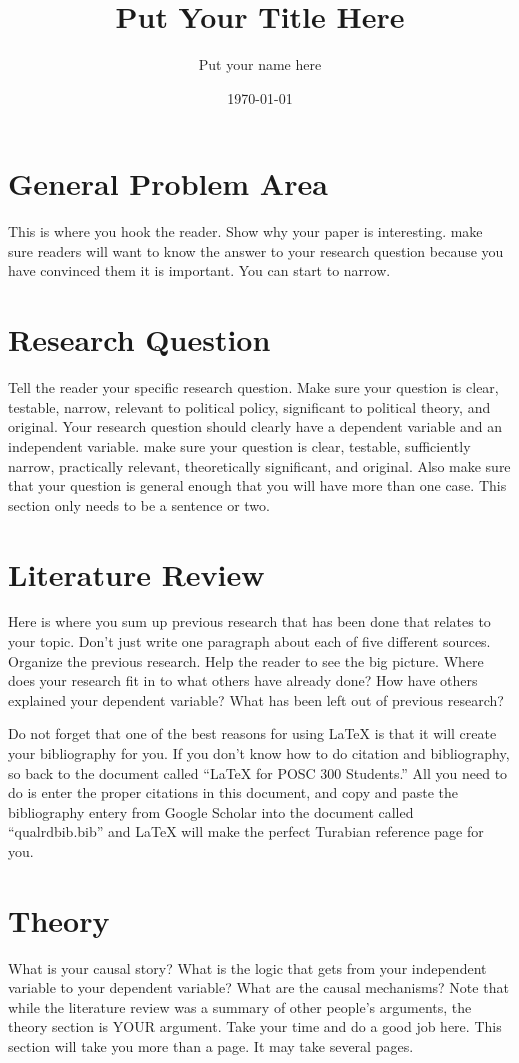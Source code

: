 \documentclass{turabian-researchpaper}
\title{Put Your Title Here}
\author{Put your name here}
\date{\today}
\begin{document}
\maketitle
\section{General Problem Area}
This is where you hook the reader. Show why your paper is interesting. make sure readers will want to know the answer to your research question because you have convinced them it is important. You can start to narrow.


\section{Research Question}
Tell the reader your specific research question. Make sure your question is clear, testable, narrow, relevant to political policy, significant to political theory, and original. Your research question should clearly have a dependent variable and an independent variable. make sure your question is clear, testable, sufficiently narrow, practically relevant, theoretically significant, and original. Also make sure that your question is general enough that you will have more than one case. This section only needs to be a sentence or two.

\section{Literature Review}
Here is where you sum up previous research that has been done that relates to your topic. Don't just write one paragraph about each of five different sources. Organize the previous research. Help the reader to see the big picture. Where does your research fit in to what others have already done? How have others explained your dependent variable? What has been left out of previous research? 

Do not forget that one of the best reasons for using \LaTeX{} is that it will create your bibliography for you. If you don't know how to do citation and bibliography, so back to the document called ``\LaTeX{} for POSC 300 Students.'' All you need to do is enter the proper citations in this document, and copy and paste the bibliography entery from Google Scholar into the document called ``qualrdbib.bib'' and \LaTeX{} will make the perfect Turabian reference page for you.

\section{Theory}
What is your causal story? What is the logic that gets from your independent variable to your dependent variable? What are the causal mechanisms? Note that while the literature review was a summary of other people's arguments, the theory section is YOUR argument. Take your time and do a good job here. This section will take you more than a page. It may take several pages.
\end{document}
